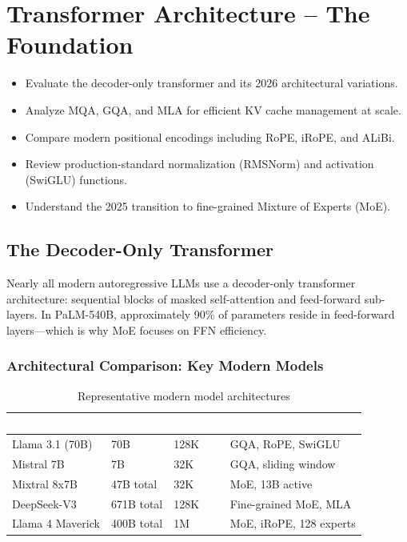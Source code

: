 \chapter{Transformer Architecture -- The Foundation}
\minitoc

\begin{chapteroverview}
  \begin{itemize}
    \item Evaluate the decoder-only transformer and its 2026 architectural variations.
    \item Analyze MQA, GQA, and MLA for efficient KV cache management at scale.
    \item Compare modern positional encodings including RoPE, iRoPE, and ALiBi.
    \item Review production-standard normalization (RMSNorm) and activation (SwiGLU) functions.
    \item Understand the 2025 transition to fine-grained Mixture of Experts (MoE).
  \end{itemize}
\end{chapteroverview}

\section{The Decoder-Only Transformer}

Nearly all modern autoregressive LLMs use a decoder-only transformer architecture: sequential blocks of masked self-attention and feed-forward sub-layers. In PaLM-540B, approximately 90\% of parameters reside in feed-forward layers---which is why MoE focuses on FFN efficiency.

\subsection{Architectural Comparison: Key Modern Models}

\begin{table}[H]
\centering\small\sffamily
{}
\begin{tabular}{L{2.8cm}L{2cm}L{2cm}L{3.5cm}}
\toprule
{}\textcolor{white}{\textbf{Model}} & \textcolor{white}{\textbf{Params}} & \textcolor{white}{\textbf{Context}} & \textcolor{white}{\textbf{Notable Features}} \\
\midrule
Llama 3.1 (70B) & 70B & 128K & GQA, RoPE, SwiGLU \\
Mistral 7B & 7B & 32K & GQA, sliding window \\
Mixtral 8x7B & 47B total & 32K & MoE, 13B active \\
DeepSeek-V3 & 671B total & 128K & Fine-grained MoE, MLA \\
Llama 4 Maverick & 400B total & 1M & MoE, iRoPE, 128 experts \\
\bottomrule
\end{tabular}
\caption{Representative modern model architectures}
\end{table}

